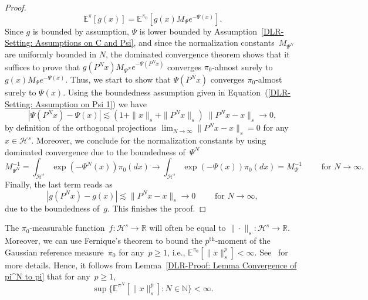 \begin{proof}
\begin{equation*}
   \mathbb{E}^{\pi} [g(x)] = \mathbb{E}^{\pi_0} [g(x)M_{\Psi} e^{-\Psi(x)} ].
 \end{equation*}
 Since $g$ is bounded by assumption, $\Psi$ is lower bounded by Assumption~\ref{DLR-Setting: Assumptions on C and Psi}, and since the normalization constants~$M_{\Psi^N}$ are uniformly bounded in $N$, the dominated convergence theorem shows that it suffices to prove that $g(P^Nx) M_{\Psi^N} e^{-\Psi(P^Nx)}$ converges $\pi_0$-almost surely to $g(x)M_{\Psi} e^{-\Psi(x)}$. Thus, we start to show that $\Psi(P^Nx)$ converges $\pi_0$-almost surely to $\Psi(x)$. Using the boundedness assumption given in Equation~(\ref{DLR-Setting: Assumption on Psi 1}) we have
 \begin{equation*}
  | \Psi(P^Nx) - \Psi(x) | \lesssim  (1 + \|x\|_s + \|P^Nx\|_s) \; \|P^Nx-x\|_s \to 0,
 \end{equation*}
 by definition of the orthogonal projections $\lim_{N \to \infty}   \|P^Nx-x\|_s = 0$ for any $x \in \mathcal{H}^s$. Moreover, we conclude for the normalization constants by using dominated convergence due to the boundedness of~$\Psi^N$
 \begin{equation*}
   M_{\Psi^N}^{-1}  = \int_{\mathcal{H}^s} \exp (-\Psi^N(x)) \pi_0(dx) \longrightarrow \int_{\mathcal{H}^s} \exp (-\Psi(x)) \pi_0(dx) = M_{\Psi}^{-1} \qquad \text{ for } N \to \infty.
 \end{equation*}
 Finally, the last term reads as 
 \begin{equation*}
  |g(P^Nx) - g(x)| \lesssim \|P^Nx-x\|_s \longrightarrow 0 \qquad \text{ for } N \to \infty,
 \end{equation*}
 due to the boundedness of~$g$. This finishes the proof.

\end{proof}

\begin{rem}
  \label{DLR: Remark Fernique's theorem}
  The $\pi_0$-measurable function~$f:\mathcal{H}^s \to \mathbb{R}$ will often be equal to $\| \cdot \|_s :\mathcal{H}^s \to \mathbb{R}$. Moreover, we can use Fernique's theorem to bound the $p^{\text{th}}$-moment of the Gaussian reference measure~$\pi_0$ for any~$p \geq 1$, i.e., $\mathbb{E}^{\pi_0}[\|x\|_s^p] < \infty$. See~\autocite[Theorem 3.11]{Hairer2009} for more details. Hence, it follows from Lemma~\ref{DLR-Proof: Lemma Convergence of pi^N to pi} that for any~$p \geq 1$, 
  \begin{equation*}
    \sup \{ \mathbb{E}^{\pi^N} [\|x\|_s^p] : N \in \mathbb{N}\} < \infty.
  \end{equation*}

\end{rem}



